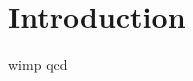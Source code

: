 \chapter{Introduction}

\Blindtext
\cite{1983HitachiXenonAndArgonLuminesince} \cite{2013antares} \gls{wimp} \gls{qcd}
\Blindtext

